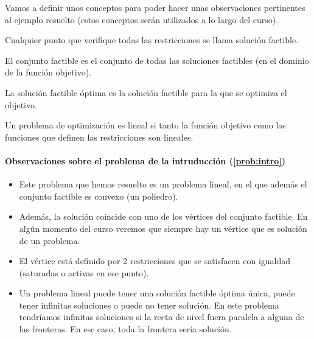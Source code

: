 
Vamos a definir unos conceptos para poder hacer unas observaciones pertinentes al ejemplo resuelto (estos conceptos serán utilizados a lo largo del curso).


\begin{defn}
Cualquier punto que verifique todas las restricciones se llama solución factible.
\end{defn}

\begin{defn}
El conjunto factible es el conjunto de todas las soluciones factibles (en el dominio de la función objetivo).
\end{defn}

\begin{defn}
La solución factible óptima es la solución factible para la que se optimiza el objetivo.
\end{defn}

\begin{defn}
Un problema de optimización es lineal si tanto la función objetivo como las funciones que definen las restricciones son lineales.
\end{defn}


\paragraph{Observaciones sobre el problema de la intruducción (\ref{prob:intro})}
\begin{itemize}
	\item Este problema que hemos resuelto es un problema lineal, en el que además el conjunto factible es convexo (un poliedro).
	\item Además, la solución coincide con uno de los vértices del conjunto factible.
	\subitem En algún momento del curso veremos que siempre hay un vértice que es solución de un problema.
	\item El vértice está definido por 2 restricciones que se satisfacen con igualdad (saturadas o activas en ese punto).
	\item Un problema lineal puede tener una solución factible óptima única, puede tener infinitas soluciones o puede no tener solución.
	\subitem En este problema tendríamos infinitas soluciones si la recta de nivel fuera paralela a alguna de las fronteras. En ese caso, toda la frontera sería solución.
	\subitem 
\end{itemize}

